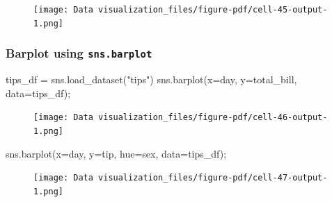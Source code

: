 \documentclass[
  letterpaper,
  DIV=11,
  numbers=noendperiod]{scrreprt}
\newenvironment{Shaded}{\begin{snugshade}}{\end{snugshade}}
\newcommand{\NormalTok}[1]{\textcolor[rgb]{0.00,0.23,0.31}{#1}}
\newcommand{\OperatorTok}[1]{\textcolor[rgb]{0.37,0.37,0.37}{#1}}
\newcommand{\StringTok}[1]{\textcolor[rgb]{0.13,0.47,0.30}{#1}}
\begin{document}
\begin{figure}[H]

{\centering \texttt{[image: Data visualization\_files/figure-pdf/cell-45-output-1.png]}

}

\end{figure}

\hypertarget{barplot-using-sns.barplot}{%
\subsubsection{\texorpdfstring{Barplot using
\texttt{sns.barplot}}{Barplot using sns.barplot}}\label{barplot-using-sns.barplot}}

\begin{Shaded}
\begin{Highlighting}[]
\NormalTok{tips\_df }\OperatorTok{=}\NormalTok{ sns.load\_dataset(}\StringTok{"tips"}\NormalTok{)}
\NormalTok{sns.barplot(x}\OperatorTok{=}\StringTok{\textquotesingle{}day\textquotesingle{}}\NormalTok{, y}\OperatorTok{=}\StringTok{\textquotesingle{}total\_bill\textquotesingle{}}\NormalTok{, data}\OperatorTok{=}\NormalTok{tips\_df)}\OperatorTok{;}
\end{Highlighting}
\end{Shaded}

\begin{figure}[H]

{\centering \texttt{[image: Data visualization\_files/figure-pdf/cell-46-output-1.png]}

}

\end{figure}

\begin{Shaded}
\begin{Highlighting}[]
\NormalTok{sns.barplot(x}\OperatorTok{=}\StringTok{\textquotesingle{}day\textquotesingle{}}\NormalTok{, y}\OperatorTok{=}\StringTok{\textquotesingle{}tip\textquotesingle{}}\NormalTok{, hue}\OperatorTok{=}\StringTok{\textquotesingle{}sex\textquotesingle{}}\NormalTok{, data}\OperatorTok{=}\NormalTok{tips\_df)}\OperatorTok{;}
\end{Highlighting}
\end{Shaded}

\begin{figure}[H]

{\centering \texttt{[image: Data visualization\_files/figure-pdf/cell-47-output-1.png]}

}

\end{figure}
\end{document}
